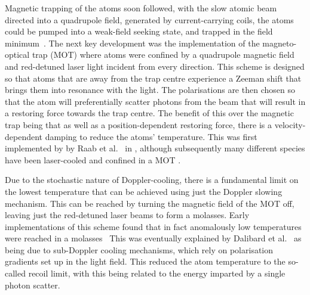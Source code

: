 Magnetic trapping of the atoms soon followed, with the slow atomic beam
directed into a quadrupole field, generated by current-carrying coils, the
atoms could be pumped into a weak-field seeking state, and trapped in the field
minimum~\cite{PhysRevLett.54.2596}. The next key development was the
implementation of the magneto-optical trap (MOT) where atoms were confined by a
quadrupole magnetic field and red-detuned laser light incident from every
direction. This scheme is designed so that atoms that are away from the trap
centre experience a Zeeman shift that brings them into resonance with the
light. The polarisations are then chosen so that the atom will preferentially
scatter photons from the beam that will result in a restoring force towards the
trap centre. The benefit of this over the magnetic trap being that as well as
a position-dependent restoring force, there is a velocity-dependent damping to
reduce the atoms' temperature. This was first implemented by by Raab et
al.~\cite{PhysRevLett.59.2631} in \Na{}, although subsequently many different
species have been laser-cooled and confined in a MOT .

Due to the stochastic nature of Doppler-cooling, there is a fundamental limit
on the lowest temperature that can be achieved using just the Doppler slowing
mechanism. This can be reached by turning the magnetic field of the MOT off,
leaving just the red-detuned laser beams to form a molasses. Early
implementations of this scheme found that in fact anomalously low temperatures
were reached in a molasses~\cite{} %
This was eventually explained by Dalibard et al.~\cite{Dalibard:89} as being
due to sub-Doppler cooling mechanisms, which rely on polarisation gradients
set up in the light field. This reduced the atom temperature to the so-called
recoil limit, with this being related to the energy imparted by a single photon
scatter.

